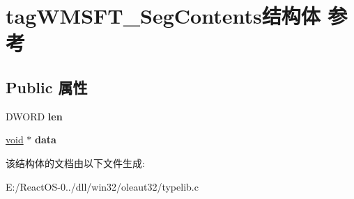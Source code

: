 \hypertarget{structtag_w_m_s_f_t___seg_contents}{}\section{tag\+W\+M\+S\+F\+T\+\_\+\+Seg\+Contents结构体 参考}
\label{structtag_w_m_s_f_t___seg_contents}
\subsection*{Public 属性}
\begin{DoxyCompactItemize}
\item 
\mbox{\label{structtag_w_m_s_f_t___seg_contents_ad7421dd6ff3f92cee710e110a75dd7be}} 
D\+W\+O\+RD {\bfseries len}
\item 
\mbox{\label{structtag_w_m_s_f_t___seg_contents_a8b937c61d1a3c826c8e4d1c5c04c00f7}} 
\hyperlink{interfacevoid}{void} $\ast$ {\bfseries data}
\end{DoxyCompactItemize}


该结构体的文档由以下文件生成\+:\begin{DoxyCompactItemize}
\item 
E\+:/\+React\+O\+S-\/0../dll/win32/oleaut32/typelib.\+c\end{DoxyCompactItemize}
